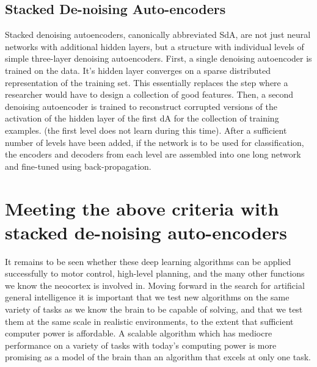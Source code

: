 \documentclass[12pt]{article}
\begin{document}
	\subsection{Stacked De-noising Auto-encoders}
	
Stacked denoising autoencoders, canonically abbreviated SdA, are not just neural networks with additional hidden layers, but a structure with individual levels of simple three-layer denoising autoencoders. First, a single denoising autoencoder is trained on the data. It's hidden layer converges on a sparse distributed representation of the training set. This essentially replaces the step where a researcher would have to design a collection of good features. Then, a second denoising autoencoder is trained to reconstruct corrupted versions of the activation of the hidden layer of the first dA for the collection of training examples. (the first level does not learn during this time). After a sufficient number of levels have been added, if the network is to be used for classification, the encoders and decoders from each level are assembled into one long network and fine-tuned using back-propagation.


\section{Meeting the above criteria with stacked de-noising auto-encoders}
\label{fart}

It remains to be seen whether these deep learning algorithms can be applied successfully to motor control, high-level planning, and the many other functions we know the neocortex is involved in. Moving forward in the search for artificial general intelligence it is important that we test new algorithms on the same variety of tasks as we know the brain to be capable of solving, and that we test them at the same scale in realistic environments, to the extent that sufficient computer power is affordable. A scalable algorithm which has mediocre performance on a variety of tasks with today's computing power is more promising as a model of the brain than an algorithm that excels at only one task.
\end{document}
